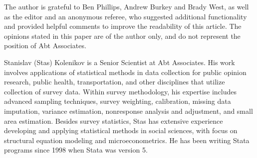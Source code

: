 The author is grateful to Ben Phillips, Andrew Burkey and Brady West,
as well as the editor and an anonymous referee,
who suggested additional functionality and provided helpful comments
to improve the readability of this article. The opinions stated in this paper
are of the author only, and do not represent the position of Abt Associates.



% 

\begin{aboutauthor}
  Stanislav (Stas) Kolenikov is a Senior Scientist at Abt Associates.
  His work involves applications of statistical methods in data collection
  for public opinion research, public health, transportation, and other disciplines 
  that utilize collection of survey data.
  Within survey methodology, his expertise includes advanced sampling techniques, 
  survey weighting, calibration, missing data imputation, variance estimation, 
  nonresponse analysis and adjustment, and small area estimation.
  Besides survey statistics, Stas has extensive experience developing and applying
  statistical methods in social sciences, with focus on structural equation
  modeling and microeconometrics. He has been writing Stata programs since
  1998 when Stata was version 5.
\end{aboutauthor}
